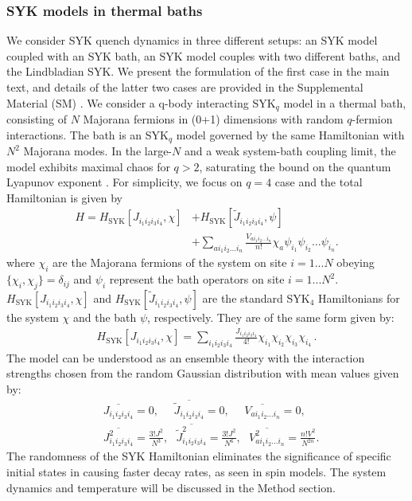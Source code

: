 \documentclass[prl,superscriptaddress,notitlepage,showpacs,twocolumn]{revtex4-2}
\begin{document}
\subsubsection{SYK models in thermal baths}
We consider SYK quench dynamics in three different setups: an SYK model coupled with an SYK bath, an SYK model couples with two different baths, and the Lindbladian SYK. We present the formulation of the first case in the main text, and details of the latter two cases are provided in the Supplemental Material (SM) \cite{suppl}. We consider a q-body interacting SYK$_q$ model in a thermal bath, consisting of $N$ Majorana fermions in (0+1) dimensions with random $q$-fermion interactions. The bath is an SYK$_q$ model governed by the same Hamiltonian with $N^2$ Majorana modes. In the large-$N$ and a weak system-bath coupling limit, the model exhibits maximal chaos for $q>2$, saturating the bound on the quantum Lyapunov exponent \cite{maldacena2016bound,polchinski2016spectrum,shenker2014multiple}. For simplicity, we focus on $q=4$ case and the total Hamiltonian is given by
\begin{align}
H=H_{\text{SYK}}[J_{i_1i_2i_3i_4},\chi]&+H_{\text{SYK}}[\tilde{J}_{i_1i_2i_3i_4},\psi] \nonumber\\
&+\sum_{ai_1i_2...i_n}\frac{V_{ai_1i_2...i_n}}{n!}\chi_a\psi_{i_1}\psi_{i_2}\dots\psi_{i_n}.\label{eq:H}
\end{align}
where $\chi_i$ are the Majorana fermions of the system on site $i=1... N$ obeying $\{\chi_i,\chi_j\}=\delta_{ij}$ and $\psi_i$ represent the bath operators on site $i=1... N^2$. $H_{\text{SYK}}[J_{i_1i_2i_3i_4},\chi]$ and $H_{\text{SYK}}[\tilde J_{i_1i_2i_3i_4},\psi]$ are the standard SYK$_4$ Hamiltonians for the system $\chi$ and the bath $\psi$, respectively. They are of the same form given by:
\begin{align}
H_{\text{SYK}}[J_{i_1i_2i_3i_4},\chi]=\sum_{i_1i_2i_3i_4}\frac{J_{i_1i_2i_3i_4}}{4!}\chi_{i_1}\chi_{i_2}\chi_{i_3}\chi_{i_4}\,.
\label{1}
\end{align}
The model can be understood as an ensemble theory with the interaction strengths chosen from the random Gaussian distribution with mean values given by:
\begin{align}
&\overline{J_{i_1i_2i_3i_4}}=0,\ \ \ \ \ \ \overline{\tilde{J}_{i_1i_2i_3i_4}}=0,\ \ \ \ \ \ \overline{V_{ai_1i_2...i_n}}=0,\\
&\overline{J_{i_1i_2i_3i_4}^2}=\frac{3!J^2}{N^3},\ \ \ \overline{\tilde{J}_{i_1i_2i_3i_4}^2}=\frac{3!J^2}{N^6},\ \ \ \overline{V_{ai_1i_2...i_n}^2}=\frac{n!V^2}{N^{2n}}.
\end{align}
The randomness of the SYK Hamiltonian eliminates the significance of specific initial states in causing faster decay rates, as seen in spin models. The system dynamics and temperature will be discussed in the Method section. 
\end{document}
